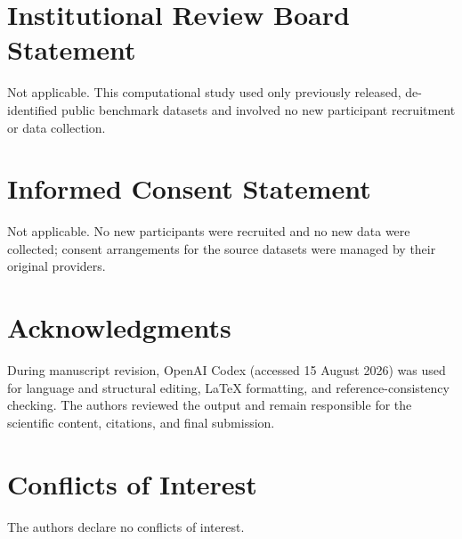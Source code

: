 \documentclass[jimaging,article,submit,pdftex,moreauthors]{Definitions/mdpi}%
\providecommand{\institutionalreview}[1]{\section*{Institutional Review Board Statement}#1}
\providecommand{\informedconsent}[1]{\section*{Informed Consent Statement}#1}
\providecommand{\acknowledgments}[1]{\section*{Acknowledgments}#1}
\providecommand{\conflictsofinterest}[1]{\section*{Conflicts of Interest}#1}
\begin{document}
\institutionalreview{Not applicable. This computational study used only previously released, de-identified public benchmark datasets and involved no new participant recruitment or data collection.}




\informedconsent{Not applicable. No new participants were recruited and no new data were collected; consent arrangements for the source datasets were managed by their original providers.}




\acknowledgments{During manuscript revision, OpenAI Codex (accessed 15 August 2026) was used for language and structural editing, LaTeX formatting, and reference-consistency checking. The authors reviewed the output and remain responsible for the scientific content, citations, and final submission.}



\conflictsofinterest{The authors declare no conflicts of interest.}










%
\end{document}
